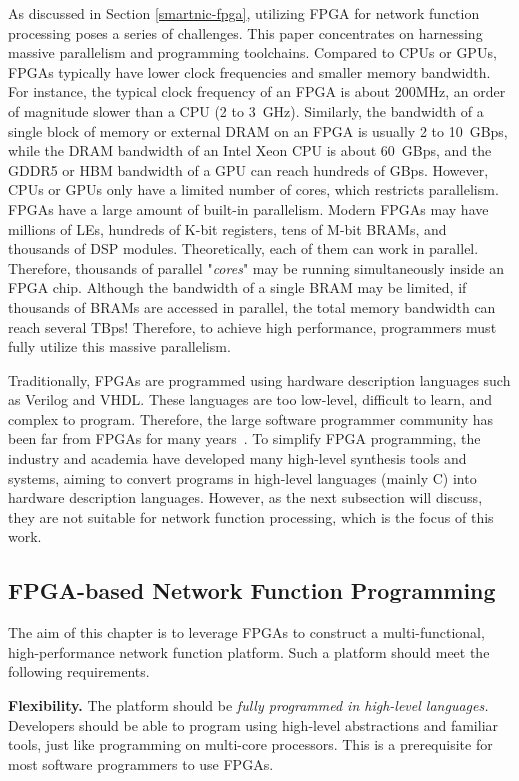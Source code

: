 As discussed in Section \ref{smartnic-fpga}, utilizing FPGA for network function processing poses a series of challenges. This paper concentrates on harnessing massive parallelism and programming toolchains. Compared to CPUs or GPUs, FPGAs typically have lower clock frequencies and smaller memory bandwidth. For instance, the typical clock frequency of an FPGA is about 200MHz, an order of magnitude slower than a CPU (2 to 3~GHz). Similarly, the bandwidth of a single block of memory or external DRAM on an FPGA is usually 2 to 10~GBps, while the DRAM bandwidth of an Intel Xeon CPU is about 60~GBps, and the GDDR5 or HBM bandwidth of a GPU can reach hundreds of GBps. However, CPUs or GPUs only have a limited number of cores, which restricts parallelism. FPGAs have a large amount of built-in parallelism. Modern FPGAs may have millions of LEs, hundreds of K-bit registers, tens of M-bit BRAMs, and thousands of DSP modules. Theoretically, each of them can work in parallel. Therefore, thousands of parallel "\textit{cores}" may be running simultaneously inside an FPGA chip. Although the bandwidth of a single BRAM may be limited, if thousands of BRAMs are accessed in parallel, the total memory bandwidth can reach several TBps! Therefore, to achieve high performance, programmers must fully utilize this massive parallelism.

Traditionally, FPGAs are programmed using hardware description languages such as Verilog and VHDL. These languages are too low-level, difficult to learn, and complex to program. Therefore, the large software programmer community has been far from FPGAs for many years~\cite{bacon2013fpga}. To simplify FPGA programming, the industry and academia have developed many high-level synthesis tools and systems, aiming to convert programs in high-level languages (mainly C) into hardware description languages. However, as the next subsection will discuss, they are not suitable for network function processing, which is the focus of this work.

\subsection{FPGA-based Network Function Programming}

The aim of this chapter is to leverage FPGAs to construct a multi-functional, high-performance network function platform. Such a platform should meet the following requirements.

\textbf{Flexibility.} The platform should be \textit{fully programmed in high-level languages.} Developers should be able to program using high-level abstractions and familiar tools, just like programming on multi-core processors. This is a prerequisite for most software programmers to use FPGAs.

